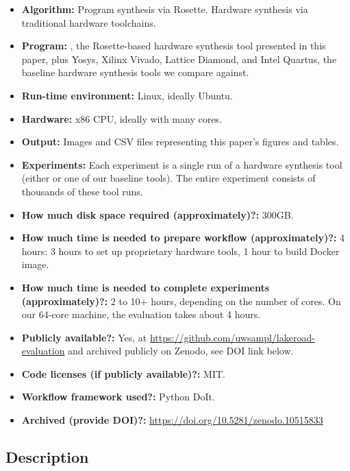 {\small
\begin{itemize}
  \item {\bf Algorithm: }
    Program synthesis via Rosette.
    Hardware synthesis via traditional hardware toolchains.
  \item {\bf Program: }
    \lr, the Rosette-based hardware synthesis tool
      presented in this paper,
      plus 
      Yosys, Xilinx Vivado, Lattice Diamond,
      and Intel Quartus,
      the baseline hardware synthesis tools
      we compare against.
  \item {\bf Run-time environment: }
    Linux, ideally Ubuntu.
  \item {\bf Hardware: }
    x86 CPU, ideally with many cores.
  \item {\bf Output: }
    Images and CSV files representing
      this paper's figures and tables.
  \item {\bf Experiments: }
    Each experiment is a single run
      of a hardware synthesis tool
      (either \lr or one of our baseline tools).
    The entire experiment consists of
      thousands of these tool runs.
  \item {\bf How much disk space required (approximately)?: }
    300GB.
  \item {\bf How much time is needed to prepare workflow (approximately)?: }
    4 hours:
      3 hours to set up proprietary hardware tools,
      1 hour to build Docker image.
  \item {\bf How much time is needed to complete experiments (approximately)?: }
    2 to 10+ hours, depending on the number of cores.
    On our 64-core machine,
      the evaluation takes
      about 4 hours.
  \item {\bf Publicly available?: }
    Yes, at \url{https://github.com/uwsampl/lakeroad-evaluation}
    and archived publicly on Zenodo, see 
    DOI link below.
    
  \item {\bf Code licenses (if publicly available)?: } 
    MIT.
  \item {\bf Workflow framework used?: }
    Python DoIt.
  \item {\bf Archived (provide DOI)?: }
  \url{https://doi.org/10.5281/zenodo.10515833}
\end{itemize}
}

\subsection{Description}

